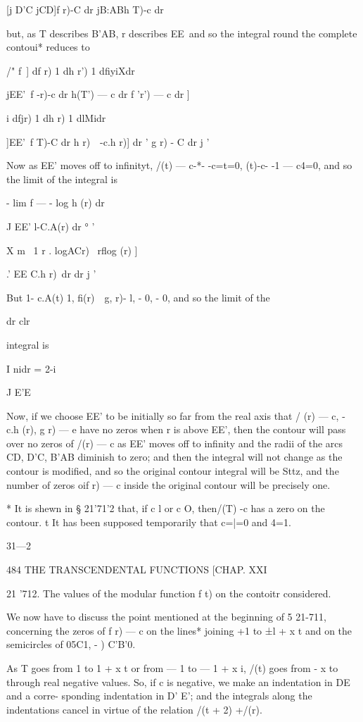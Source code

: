 [j D'C jCD]f r)-C dr jB:ABh T)-c dr

but, as T describes B'AB, r describes EE\ and so the integral round
the complete contoui* reduces to

/" f\ ] df r) 1 dh r') 1 dfiyiXdr

jEE'\ f -r)-c dr h(T') — c dr f 'r') — c dr ]

 i dfjr) 1 dh r) 1 dlMidr

]EE'\ f T)-C dr h r)\ \ -c.h r)] dr ' g r) - C dr j '

Now as EE' moves off to infinityt, /(t) — c-*- -c=t=0, (t)-c- -1 —
c4=0, and so the limit of the integral is

- lim f — - log h (r) dr

J EE' l-C.A(r) dr ° '

 X m \ 1 r . logACr) \ rflog (r) ]

.' EE C.h r)\ dr dr j '

But 1- c.A(t) 1, fi(r)~ \,g, r)- l, - 0, - 0, and so the limit of the

dr clr

integral is

I nidr = 2-i

J E'E

Now, if we choose EE' to be initially so far from the real axis that /
(r) — c, - c.h (r), g r) — e have no zeros when r is above EE', then
the contour will pass over no zeros of /(r) — c as EE' moves off to
infinity and the radii of the arcs CD, D'C, B'AB diminish to zero;
and then the integral will not change as the contour is modified, and
so the original contour integral will be Sttz, and the number of zeros
oif r) — c inside the original contour will be precisely one.

* It is shewn in § 21'71'2 that, if c l or c O, then/(T) -c has a zero
on the contour. t It has been supposed temporarily that c=|=0 and 4=1.

31—2

484 THE TRANSCENDENTAL FUNCTIONS [CHAP. XXI

21 '712. The values of the modular function f t) on the contoitr
considered.

We now have to discuss the point mentioned at the beginning of 5
21-711, concerning the zeros of f r) — c on the lines* joining +1 to
±l + x t and on the semicircles of 05C1, - ) C'B'0.

As T goes from 1 to 1 + x t or from — 1 to — 1 + x i, /(t) goes from -
x to through real negative values. So, if c is negative, we make an
indentation in DE and a corre- sponding indentation in D' E'; and the
integrals along the indentations cancel in virtue of the relation /(t
+ 2) +/(r).

